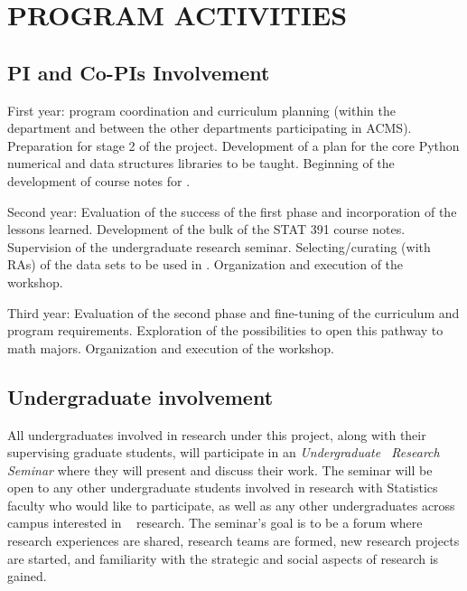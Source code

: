 \section{PROGRAM ACTIVITIES}
\label{sec:activities}

\subsection{PI and Co-PIs Involvement}

\bits
\item First year: program coordination and curriculum planning (within the department and between the other departments participating in ACMS). Preparation for stage 2 of the project. 
Development of a plan for the core Python numerical and data structures libraries to be taught.
Beginning of the development of course notes for \statcl.

\item Second year: Evaluation of the success of the first phase and
  incorporation of the lessons learned. Development of the bulk of the STAT 391 course
  notes. Supervision of  the undergraduate research seminar. 
 Selecting/curating  (with RAs) of the data sets to be used in
  \statcl. Organization and execution of the workshop. 

\item Third year: Evaluation of the second phase and fine-tuning of
  the curriculum and program requirements. Exploration of the possibilities to
  open this pathway to math majors. Organization and execution of the workshop. 
 \eits

\subsection{Undergraduate involvement}
\label{sec:ugradseminar}


All undergraduates involved in research under this project, along with
their supervising graduate students, will participate in an {\em
  Undergraduate \cdse\ Research Seminar} where they will present and
discuss their work.  The seminar will be open to any other
undergraduate students involved in research with Statistics faculty
who would like to participate, as well as any other undergraduates
across campus interested in \cdse~ research. The seminar's goal is to
be a forum where research experiences are shared, research teams are
formed, new research projects are started, and familiarity with the
strategic and social aspects of research is gained.

